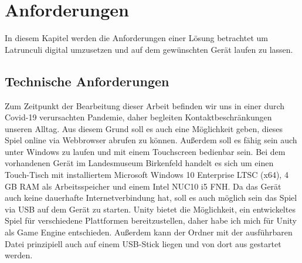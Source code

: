 
\chapter{Anforderungen}
\label{ch:Analyse}
In diesem Kapitel werden die Anforderungen einer Lösung betrachtet um Latrunculi digital umzusetzen und auf dem gewünschten Gerät laufen zu lassen.


\section{Technische Anforderungen}
\label{ch:Analyse:sec:TechAnforderungen}
Zum Zeitpunkt der Bearbeitung dieser Arbeit befinden wir uns in einer durch Covid-19 verursachten Pandemie, daher begleiten Kontaktbeschränkungen unseren Alltag. Aus diesem Grund soll es auch eine Möglichkeit geben, dieses Spiel online via Webbrowser abrufen zu können. Außerdem soll es fähig sein auch unter Windows zu laufen und mit einem Touchscreen bedienbar sein. Bei dem vorhandenen Gerät im Landesmuseum Birkenfeld handelt es sich um einen Touch-Tisch mit installiertem Microsoft Windows 10 Enterprise LTSC (x64), 4 GB RAM als Arbeitsspeicher und einem Intel NUC10 i5 FNH. Da das Gerät auch keine dauerhafte Internetverbindung hat, soll es auch möglich sein das Spiel via USB auf dem Gerät zu starten. Unity bietet die Möglichkeit, ein entwickeltes Spiel für verschiedene Plattformen bereitzustellen, daher habe ich mich für Unity als Game Engine entschieden. Außerdem kann der Ordner mit der ausführbaren Datei prinzipiell auch auf einem USB-Stick liegen und von dort aus gestartet werden.

